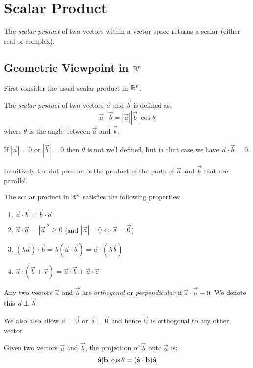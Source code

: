 \documentclass[../main.tex]{subfiles}
\begin{document}
\section{Scalar Product}
The \textit{scalar product} of two vectors within a vector space returns a scalar (either real or complex).
\subsection{Geometric Viewpoint in \texorpdfstring{$\mathbb{R}^{n}$}{Real Vector Spaces}}
First consider the usual scalar product in $\mathbb{R}^{n}$.
\begin{definition}
  The \textit{scalar product} of two vectors $\vec{a}$ and $\vec{b}$ is defined as:
  \[
    \vec{a} \cdot \vec{b} = |\vec{a}||\vec{b}|\cos\theta
  \]
  where $\theta$ is the angle between $\vec{a}$ and $\vec{b}$.
\end{definition}
\begin{remark}[Note]
  If $|\vec{a}| = 0$ or $|\vec{b}| = 0$ then $\theta$ is not well defined, but in that case we have $\vec{a} \cdot \vec{b} = 0$.
\end{remark}
Intuitively the dot product is the product of the parts of $\vec{a}$ and $\vec{b}$ that are parallel.

The scalar product in $\mathbb{R}^{n}$ satisfies the following properties:
\begin{enumerate}
  \item $\vec{a} \cdot \vec{b} = \vec{b} \cdot \vec{a}$
  \item $\vec{a} \cdot \vec{a} = |\vec{a}|^2 \geq 0$ (and $|\vec{a}| = 0 \iff \vec{a} = \vec{0}$)
  \item $(\lambda \vec{a}) \cdot \vec{b} = \lambda (\vec{a} \cdot \vec{b}) = \vec{a} \cdot (\lambda \vec{b})$
  \item $\vec{a} \cdot (\vec{b} + \vec{c}) = \vec{a} \cdot \vec{b} + \vec{a} \cdot \vec{c}$
\end{enumerate}
\begin{definition}[Orthogonal]
  Any two vectors $\vec{a}$ and $\vec{b}$ are \textit{orthogonal} or \textit{perpendicular} if $\vec{a} \cdot \vec{b} = 0$.
  We denote this $\vec{a} \perp \vec{b}$.
\end{definition}
\begin{remark}[Note]
  We also also allow $\vec{a} = \vec{0}$ or $\vec{b} = \vec{0}$ and hence $\vec{0}$ is orthogonal to any other vector.
\end{remark}
\begin{definition}[Projection]
  Given two vectors $\vec{a}$ and $\vec{b}$, the projection of $\vec{b}$ onto $\vec{a}$ is:
  \[
    \hat{\mathbf{a}}|\boldsymbol{\mathbf{b}}|\cos \theta = (\hat{\mathbf{a}} \cdot \boldsymbol{\mathbf{b}}) \hat{\mathbf{a}}
  \]
\end{definition}
\end{document}
